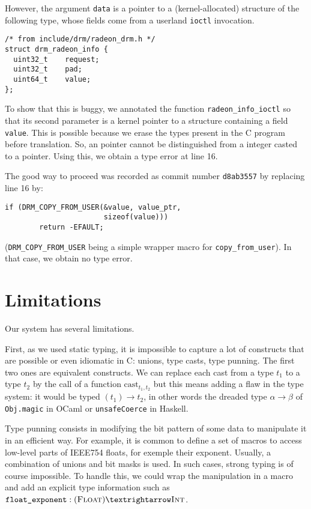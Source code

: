 However, the argument \texttt{data} is a pointer to a (kernel-allocated)
structure of the following type, whose fields come from a userland
\texttt{ioctl} invocation.

\begin{verbatim}
/* from include/drm/radeon_drm.h */
struct drm_radeon_info {
  uint32_t    request;
  uint32_t    pad;
  uint64_t    value;
};
\end{verbatim}

To show that this is buggy, we annotated the function
\texttt{radeon\_info\_ioctl} so that its second parameter is a kernel pointer to
a structure containing a \qUser field \texttt{value}. This is possible because
we erase the types present in the C program before translation. So, an pointer
cannot be distinguished from a integer casted to a pointer. Using this, we
obtain a type error at line 16.

The good way to proceed was recorded as commit number \texttt{d8ab3557} by
replacing line 16 by:

\begin{verbatim}
if (DRM_COPY_FROM_USER(&value, value_ptr,
                       sizeof(value)))
        return -EFAULT;
\end{verbatim}

(\texttt{DRM\_COPY\_FROM\_USER} being a simple wrapper macro for
\texttt{copy\_from\_user}). In that case, we obtain no type error.

\section{Limitations}
\label{sec:limit}

Our system has several limitations.

First, as we used static typing, it is impossible to capture a lot of constructs
that are possible or even idiomatic in C: unions, type casts, type punning. The
first two ones are equivalent constructs. We can replace each cast from a type
$t_1$ to a type $t_2$ by the call of a function $\mathrm{cast}_{t_1,t_2}$ but
this means adding a flaw in the type system: it would be typed $(t_1) → t_2$,
in other words the dreaded type $α → β$ of \texttt{Obj.magic} in OCaml
or \texttt{unsafeCoerce} in Haskell.

Type punning consists in modifying the bit pattern of some data to manipulate it
in an efficient way. For example, it is common to define a set of macros to
access low-level parts of IEEE754 floats, for exemple their exponent. Usually, a
combination of unions and bit masks is used. In such cases, strong typing is of
course impossible. To handle this, we could wrap the manipulation in a macro and
add an explicit type information such as $\texttt{float\_exponent} : (\tFloat) →
\tInt$.


